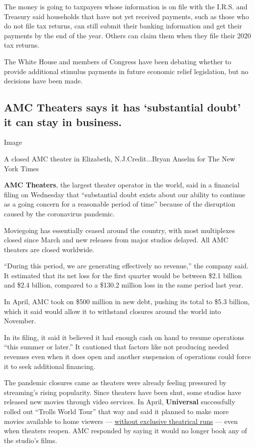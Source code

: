 The money is going to taxpayers whose information is on file with the
I.R.S. and Treasury said households that have not yet received payments,
such as those who do not file tax returns, can still submit their
banking information and get their payments by the end of the year.
Others can claim them when they file their 2020 tax returns.

The White House and members of Congress have been debating whether to
provide additional stimulus payments in future economic relief
legislation, but no decisions have been made.

\hypertarget{amc-theaters-says-it-has-substantial-doubt-it-can-stay-in-business}{%
\subsection{AMC Theaters says it has `substantial doubt' it can stay in
business.}\label{amc-theaters-says-it-has-substantial-doubt-it-can-stay-in-business}}

Image

A closed AMC theater in Elizabeth, N.J.Credit...Bryan Anselm for The New
York Times

\textbf{AMC Theaters}, the largest theater operator in the world, said
in a financial filing on Wednesday that ``substantial doubt exists about
our ability to continue as a going concern for a reasonable period of
time'' because of the disruption caused by the coronavirus pandemic.

Moviegoing has essentially ceased around the country, with most
multiplexes closed since March and new releases from major studios
delayed. All AMC theaters are closed worldwide.

``During this period, we are generating effectively no revenue,'' the
company said. It estimated that its net loss for the first quarter would
be between \$2.1 billion and \$2.4 billion, compared to a \$130.2
million loss in the same period last year.

In April, AMC took on \$500 million in new debt, pushing its total to
\$5.3 billion, which it said would allow it to withstand closures around
the world into November.

In its filing, it said it believed it had enough cash on hand to resume
operations ``this summer or later.'' It cautioned that factors like not
producing needed revenues even when it does open and another suspension
of operations could force it to seek additional financing.

The pandemic closures came as theaters were already feeling pressured by
streaming's rising popularity. Since theaters have been shut, some
studios have released new movies through video services. In April,
\textbf{Universal} successfully rolled out ``Trolls World Tour'' that
way and said it planned to make more movies available to home viewers
---
\href{https://www.nytimes3xbfgragh.onion/2020/04/28/business/amc-universal-trolls-theaters-coronavirus.html}{without
exclusive theatrical runs} --- even when theaters reopen. AMC responded
by saying it would no longer book any of the studio's films.

